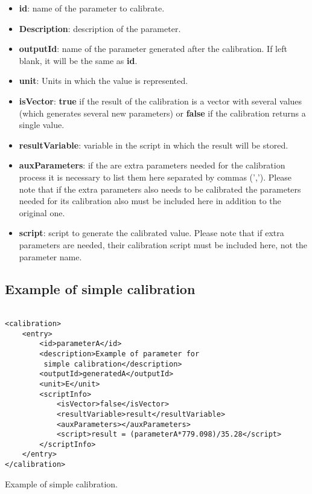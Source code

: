 \begin{itemize}
\item \textbf{id}: name of the parameter to calibrate.
\item \textbf{Description}: description of the parameter.
\item \textbf{outputId}: name of the parameter generated after the calibration. If left blank, it will be the same as \textbf{id}.
\item \textbf{unit}: Units in which the value is represented.
\item \textbf{isVector}: \textbf{true} if the result of the calibration is a vector with several values (which generates several new parameters) or \textbf{false} if the calibration returns a single value.
\item \textbf{resultVariable}: variable in the script in which the result will be stored.
\item \textbf{auxParameters}: if the are extra parameters needed for the calibration process it is necessary to list them here separated by commas (','). Please note that if the extra parameters also needs to be calibrated the parameters needed for its calibration also must be included here in addition to the original one.
\item \textbf{script}: script to generate the calibrated value. Please note that if extra parameters are needed, their calibration script must be included here, not the parameter name. 
\end{itemize}

\subsection{Example of simple calibration}

\begin{table}[H]
\lstset{language=XML}
\begin{lstlisting}

<calibration>
	<entry>
		<id>parameterA</id>
		<description>Example of parameter for
		 simple calibration</description>
		<outputId>generatedA</outputId> 
		<unit>E</unit>
		<scriptInfo>
			<isVector>false</isVector>
			<resultVariable>result</resultVariable>
			<auxParameters></auxParameters>
			<script>result = (parameterA*779.098)/35.28</script>
		</scriptInfo>
	</entry>
</calibration>
\end{lstlisting}
\caption{Example of simple calibration.}
\label{Table5.7}
\end{table}

